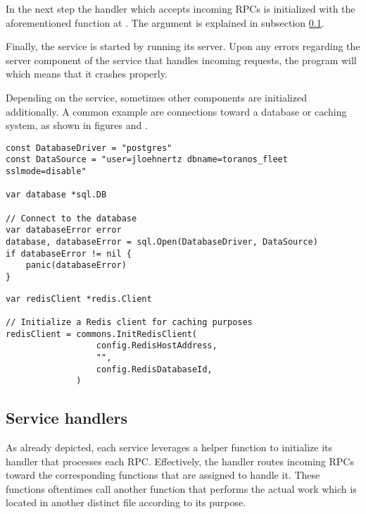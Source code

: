 \documentclass[12pt,a4paper,twoside]{report}
\begin{document}
In the next step the handler which accepts incoming RPCs is initialized with the
aforementioned function at .
The argument  is explained in subsection \ref{subsect:service-handlers}.

Finally, the service is started by running its server. Upon any errors regarding
the server component of the service that handles incoming requests,
the program will  which means that it crashes properly.

Depending on the service, sometimes other components are initialized additionally.
A common example are connections toward a database or caching system,
as shown in figures 
and .

\begin{lstlisting}[title=services/fleet-controller/main.go, float, floatplacement=H]
const DatabaseDriver = "postgres"
const DataSource = "user=jloehnertz dbname=toranos_fleet sslmode=disable"

var database *sql.DB

// Connect to the database
var databaseError error
database, databaseError = sql.Open(DatabaseDriver, DataSource)
if databaseError != nil {
	panic(databaseError)
}
\end{lstlisting}

\begin{lstlisting}[title=services/fleet-monitor/main.go, float, floatplacement=H]
var redisClient *redis.Client

// Initialize a Redis client for caching purposes
redisClient = commons.InitRedisClient(
                  config.RedisHostAddress,
                  "",
                  config.RedisDatabaseId,
              )
\end{lstlisting}

\subsection{Service handlers} \label{subsect:service-handlers}

As already depicted, each service leverages a helper function to initialize
its handler that processes each RPC. Effectively, the handler routes incoming
RPCs toward the corresponding functions that are assigned to handle it.
These functions oftentimes call another function that performs the actual work
which is located in another distinct file according to its purpose.
\end{document}
